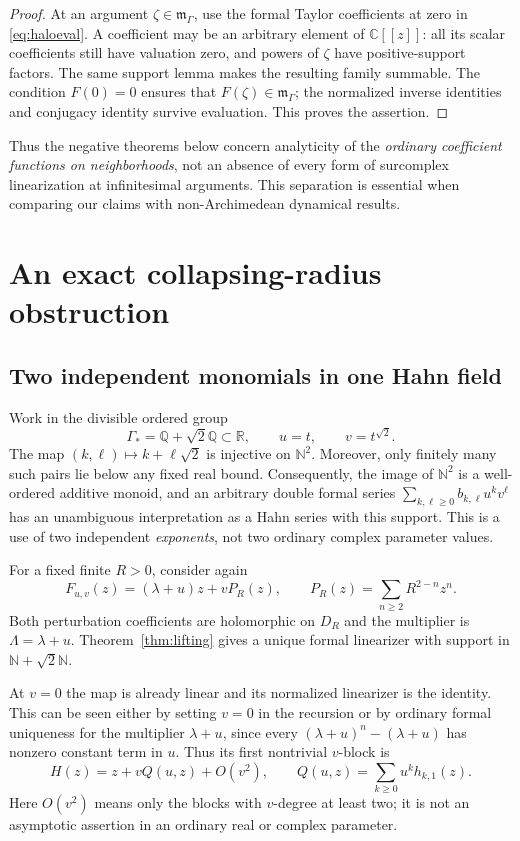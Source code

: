 \documentclass[11pt,a4paper]{article}
\numberwithin{equation}{section}
\theoremstyle{definition}
\theoremstyle{remark}
\newcommand{\C}{\mathbb C}
\newcommand{\R}{\mathbb R}
\newcommand{\Q}{\mathbb Q}
\newcommand{\N}{\mathbb N}
\newcommand{\mm}{\mathfrak m}
\newcommand{\Gstar}{\Gamma_*}
\begin{document}
\begin{proof}
At an argument $\zeta\in\mm_\Gamma$, use the formal Taylor coefficients
at zero in \eqref{eq:haloeval}. A coefficient may be an arbitrary element
of $\C[[z]]$: all its scalar coefficients still have valuation zero, and
powers of $\zeta$ have positive-support factors. The same support lemma
makes the resulting family summable. The condition $F(0)=0$ ensures that
$F(\zeta)\in\mm_\Gamma$; the normalized inverse identities and conjugacy
identity survive evaluation. This proves the assertion.
\end{proof}

Thus the negative theorems below concern analyticity of the \emph{ordinary
coefficient functions on neighborhoods}, not an absence of every form of
surcomplex linearization at infinitesimal arguments. This separation is
essential when comparing our claims with non-Archimedean dynamical results.

\section{An exact collapsing-radius obstruction}\label{sec:collapse}

\subsection{Two independent monomials in one Hahn field}

Work in the divisible ordered group
\[
 \Gstar=\Q+\sqrt2\Q\subset\R,
 \qquad u=t,\qquad v=t^{\sqrt2}.
\]
The map $(k,\ell)\mapsto k+\ell\sqrt2$ is injective on $\N^2$.
Moreover, only finitely many such pairs lie below any fixed real bound.
Consequently, the image of $\N^2$ is a well-ordered additive monoid, and
an arbitrary double formal series
$\sum_{k,\ell\ge0}b_{k,\ell}u^kv^\ell$ has an unambiguous interpretation
as a Hahn series with this support. This is a use of two independent
\emph{exponents}, not two ordinary complex parameter values.

For a fixed finite $R>0$, consider again
\[
 F_{u,v}(z)=(\lambda+u)z+vP_R(z),\qquad
 P_R(z)=\sum_{n\ge2}R^{2-n}z^n.
\]
Both perturbation coefficients are holomorphic on $D_R$ and the multiplier
is $\Lambda=\lambda+u$. Theorem~\ref{thm:lifting} gives a unique formal
linearizer with support in $\N+\sqrt2\N$.

At $v=0$ the map is already linear and its normalized linearizer is the
identity. This can be seen either by setting $v=0$ in the recursion or by
ordinary formal uniqueness for the multiplier $\lambda+u$, since every
$(\lambda+u)^n-(\lambda+u)$ has nonzero constant term in $u$.
Thus its first nontrivial $v$-block is
\begin{equation}\label{eq:Qblock}
 H(z)=z+vQ(u,z)+O(v^2),\qquad
 Q(u,z)=\sum_{k\ge0}u^k h_{k,1}(z).
\end{equation}
Here $O(v^2)$ means only the blocks with $v$-degree at least two; it is not
an asymptotic assertion in an ordinary real or complex parameter.
\end{document}
